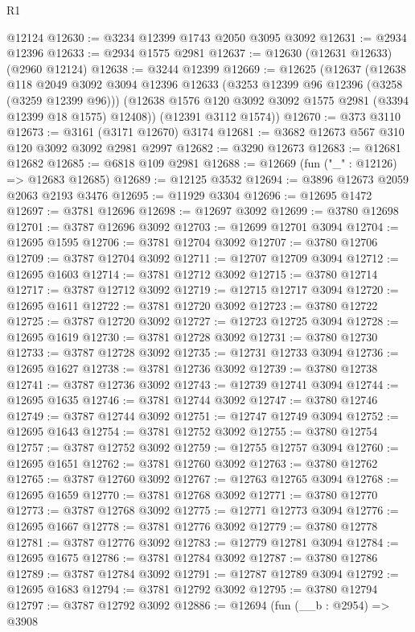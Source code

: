 \begin{lexlean}{R1}
\begin{coremodule}
    @12124
@12630 := @3234 @12399 @1743 @2050 @3095 @3092
@12631 := @2934 @12396
@12633 := @2934 @1575 @2981
@12637 := @12630 (@12631 @12633) (@2960 @12124)
@12638 := @3244 @12399
@12669 := @12625
    (@12637
      (@12638
        @118
        @2049
        @3092
        @3094
        @12396
        @12633
        (@3253 @12399 @96 @12396 (@3258 (@3259 @12399 @96)))
        (@12638 @1576 @120 @3092 @3092 @1575 @2981 (@3394 @12399 @18 @1575) @12408))
      (@12391 @3112 @1574))
@12670 := @373 @3110
@12673 := @3161 (@3171 @12670) @3174
@12681 := @3682 @12673 @567 @310 @120 @3092 @3092 @2981 @2997
@12682 := @3290 @12673
@12683 := @12681 @12682
@12685 := @6818 @109 @2981
@12688 := @12669 (fun ("_" : @12126) => @12683 @12685)
@12689 := @12125 @3532
@12694 := @3896 @12673 @2059 @2063 @2193 @3476
@12695 := @11929 @3304
@12696 := @12695 @1472
@12697 := @3781 @12696
@12698 := @12697 @3092
@12699 := @3780 @12698
@12701 := @3787 @12696 @3092
@12703 := @12699 @12701 @3094
@12704 := @12695 @1595
@12706 := @3781 @12704 @3092
@12707 := @3780 @12706
@12709 := @3787 @12704 @3092
@12711 := @12707 @12709 @3094
@12712 := @12695 @1603
@12714 := @3781 @12712 @3092
@12715 := @3780 @12714
@12717 := @3787 @12712 @3092
@12719 := @12715 @12717 @3094
@12720 := @12695 @1611
@12722 := @3781 @12720 @3092
@12723 := @3780 @12722
@12725 := @3787 @12720 @3092
@12727 := @12723 @12725 @3094
@12728 := @12695 @1619
@12730 := @3781 @12728 @3092
@12731 := @3780 @12730
@12733 := @3787 @12728 @3092
@12735 := @12731 @12733 @3094
@12736 := @12695 @1627
@12738 := @3781 @12736 @3092
@12739 := @3780 @12738
@12741 := @3787 @12736 @3092
@12743 := @12739 @12741 @3094
@12744 := @12695 @1635
@12746 := @3781 @12744 @3092
@12747 := @3780 @12746
@12749 := @3787 @12744 @3092
@12751 := @12747 @12749 @3094
@12752 := @12695 @1643
@12754 := @3781 @12752 @3092
@12755 := @3780 @12754
@12757 := @3787 @12752 @3092
@12759 := @12755 @12757 @3094
@12760 := @12695 @1651
@12762 := @3781 @12760 @3092
@12763 := @3780 @12762
@12765 := @3787 @12760 @3092
@12767 := @12763 @12765 @3094
@12768 := @12695 @1659
@12770 := @3781 @12768 @3092
@12771 := @3780 @12770
@12773 := @3787 @12768 @3092
@12775 := @12771 @12773 @3094
@12776 := @12695 @1667
@12778 := @3781 @12776 @3092
@12779 := @3780 @12778
@12781 := @3787 @12776 @3092
@12783 := @12779 @12781 @3094
@12784 := @12695 @1675
@12786 := @3781 @12784 @3092
@12787 := @3780 @12786
@12789 := @3787 @12784 @3092
@12791 := @12787 @12789 @3094
@12792 := @12695 @1683
@12794 := @3781 @12792 @3092
@12795 := @3780 @12794
@12797 := @3787 @12792 @3092
@12886 := @12694
    (fun (__b : @2954) =>
    @3908

\end{coremodule}
\end{lexlean}
